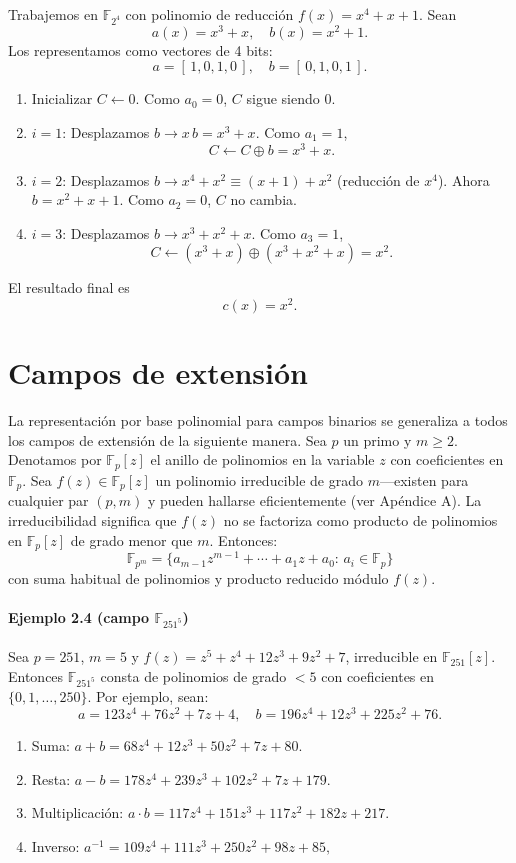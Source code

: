 Trabajemos en \(\mathbb{F}_{2^4}\) con polinomio de reducción \(f(x)=x^4 + x + 1\).  
Sean
\[
  a(x) = x^3 + x,\quad b(x) = x^2 + 1.
\]
Los representamos como vectores de 4 bits: 
\[
  a = [\,1,0,1,0\,],\quad b = [\,0,1,0,1\,].
\]
\begin{enumerate}
  \item Inicializar \(C\gets0\). Como \(a_0=0\), \(C\) sigue siendo 0.
  \item \(i=1\): Desplazamos \(b\to x\,b = x^3 + x\). Como \(a_1=1\), 
    \[
      C \gets C \oplus b = x^3 + x.
    \]
  \item \(i=2\): Desplazamos \(b\to x^4 + x^2 \equiv (x+1) + x^2\) (reducción de \(x^4\)). 
    Ahora \(b = x^2 + x + 1\). Como \(a_2=0\), \(C\) no cambia.
  \item \(i=3\): Desplazamos \(b\to x^3 + x^2 + x\). Como \(a_3=1\), 
    \[
      C \gets (x^3 + x)\oplus(x^3 + x^2 + x) = x^2.
    \]
\end{enumerate}
El resultado final es 
\[
  c(x) = x^2.
\]



\section{Campos de extensión}
La representación por base polinomial para campos binarios se generaliza a todos los campos de extensión de la siguiente manera. Sea $p$ un primo y $m\ge2$. Denotamos por $\mathbb{F}_p[z]$ el anillo de polinomios en la variable $z$ con coeficientes en $\mathbb{F}_p$. Sea $f(z)\in\mathbb{F}_p[z]$ un polinomio irreducible de grado $m$—existen para cualquier par $(p,m)$ y pueden hallarse eficientemente (ver Apéndice A). La irreducibilidad significa que $f(z)$ no se factoriza como producto de polinomios en $\mathbb{F}_p[z]$ de grado menor que $m$. Entonces:
\[
  \mathbb{F}_{p^m}=\{a_{m-1}z^{m-1}+\cdots+a_1z+a_0:\,a_i\in\mathbb{F}_p\}
\]
con suma habitual de polinomios y producto reducido módulo $f(z)$.

\paragraph{Ejemplo 2.4 (campo $\mathbb{F}_{251^5}$)}
Sea $p=251$, $m=5$ y $f(z)=z^5+z^4+12z^3+9z^2+7$, irreducible en $\mathbb{F}_{251}[z]$. Entonces $\mathbb{F}_{251^5}$ consta de polinomios de grado \(<5\) con coeficientes en $\{0,1,\dots,250\}$. Por ejemplo, sean:
\[
  a=123z^4+76z^2+7z+4,\quad b=196z^4+12z^3+225z^2+76.
\]
\begin{enumerate}
  \item Suma: $a+b=68z^4+12z^3+50z^2+7z+80.$
  \item Resta: $a-b=178z^4+239z^3+102z^2+7z+179.$
  \item Multiplicación: $a\cdot b=117z^4+151z^3+117z^2+182z+217.$
  \item Inverso: $a^{-1}=109z^4+111z^3+250z^2+98z+85,$
\end{enumerate}
